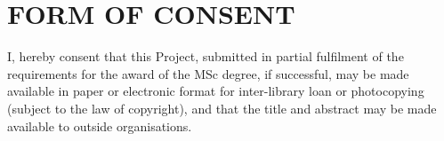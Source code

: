 \chapter*{FORM OF CONSENT}

I, \studentfname{} \studentlname{} hereby consent that this Project, submitted in partial fulfilment of the requirements for the award of the MSc degree, if successful, may be made available in paper or electronic format for inter-library loan or photocopying (subject to the law of copyright), and that the title and abstract may be made available to outside organisations.
\vfill
\noindent \namesigdate{\studentfname{} \studentlname{}} \hfill